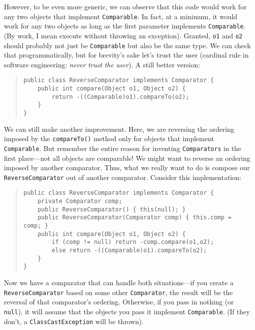 \documentclass[12pt]{article}
\begin{document}
However, to be even more generic, we can observe that this code would
work for any two objects that implement \texttt{Comparable}.  In fact,
at a minimum, it would work for any two objects as long as the first
parameter implements \texttt{Comparable}.  (By work, I mean execute
without throwing an exception).  Granted, \texttt{o1} and \texttt{o2}
should probably not just be \texttt{Comparable} but also be the same
type.  We can check that programmatically, but for brevity's sake
let's trust the user (cardinal rule in software engineering:
\emph{never trust the user}).  A still better version:
\begin{quote}
\begin{verbatim}
public class ReverseComparator implements Comparator {
    public int compare(Object o1, Object o2) {
        return -((Comparable)o1).compareTo(o2);
    }
}
\end{verbatim}
\end{quote}

We can still make another improvement.  Here, we are reversing the
ordering imposed by the \texttt{compareTo()} method only for objects
that implement \texttt{Comparable}.  But remember the entire reason
for inventing \texttt{Comparators} in the first place---not all
objects are comparable!  We might want to reverse an ordering imposed
by another comparator.  Thus, what we really want to do is compose our
\texttt{ReverseComparator} out of another comparator.  Consider this
implementation:
\begin{quote}
\begin{verbatim}
public class ReverseComparator implements Comparator {
    private Comparator comp;
    public ReverseComparator() { this(null); }
    public ReverseComparator(Comparator comp) { this.comp = comp; }
    public int compare(Object o1, Object o2) {
        if (comp != null) return -comp.compare(o1,o2);
        else return -((Comparable)o1).compareTo(o2);
    }
}
\end{verbatim}
\end{quote}

Now we have a comparator that can handle both situations---if you
create a \texttt{ReverseComparator} based on some other
\texttt{Comparator}, the result will be the reversal of that
comparator's ordering.  Otherwise, if you pass in nothing (or
\texttt{null}), it will assume that the objects you pass it implement
\texttt{Comparable}.  (If they don't, a \texttt{ClassCastException}
will be thrown).
\end{document}

